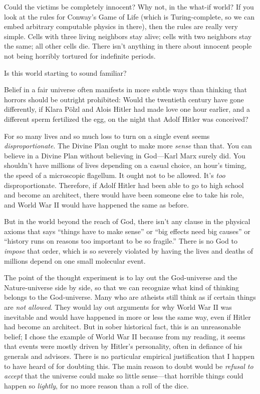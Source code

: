 {
 Could the victims be completely innocent? Why not, in the what-if
world? If you look at the rules for Conway's Game of
Life (which is Turing-complete, so we can embed arbitrary computable
physics in there), then the rules are really very simple. Cells with
three living neighbors stay alive; cells with two neighbors stay the
same; all other cells die. There isn't anything in
there about innocent people not being horribly tortured for indefinite
periods.}

{
 Is this world starting to sound familiar?}

{
 Belief in a fair universe often manifests in more subtle ways than
thinking that horrors should be outright prohibited: Would the
twentieth century have gone differently, if Klara Pölzl and Alois
Hitler had made love one hour earlier, and a different sperm fertilized
the egg, on the night that Adolf Hitler was conceived?}

{
 For so many lives and so much loss to turn on a single event seems
\textit{disproportionate}. The Divine Plan ought to make more
\textit{sense} than that. You can believe in a Divine Plan without
believing in God---Karl Marx surely did. You shouldn't
have millions of lives depending on a casual choice, an
hour's timing, the speed of a microscopic flagellum. It
ought not to be allowed. It's \textit{too}
disproportionate. Therefore, if Adolf Hitler had been able to go to
high school and become an architect, there would have been someone else
to take his role, and World War II would have happened the same as
before.}

{
 But in the world beyond the reach of God, there
isn't any clause in the physical axioms that says
``things have to make sense'' or
``big effects need big causes'' or
``history runs on reasons too important to be so
fragile.'' There is no God to \textit{impose} that
order, which is so severely violated by having the lives and deaths of
millions depend on one small molecular event.}

{
 The point of the thought experiment is to lay out the God-universe
and the Nature-universe side by side, so that we can recognize what
kind of thinking belongs to the God-universe. Many who are atheists
still think as if certain things are \textit{not allowed}. They would
lay out arguments for why World War II was inevitable and would have
happened in more or less the same way, even if Hitler had become an
architect. But in sober historical fact, this is an unreasonable
belief; I chose the example of World War II because from my reading, it
seems that events were mostly driven by Hitler's
personality, often in defiance of his generals and advisors. There is
no particular empirical justification that I happen to have heard of
for doubting this. The main reason to doubt would be \textit{refusal to
accept} that the universe could make so little sense---that horrible
things could happen so \textit{lightly}, for no more reason than a roll
of the dice.}

